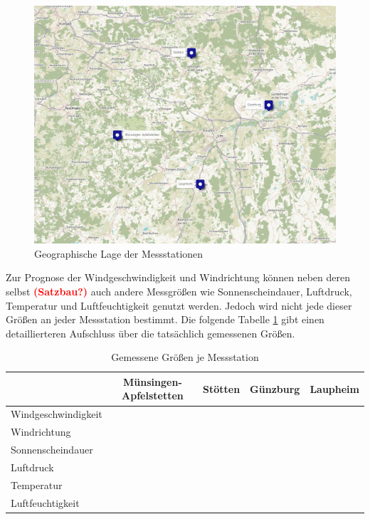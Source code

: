 \documentclass[
12pt, %
toc=listofnumbered, %
toc=chapterentrydotfill, %
numbers=noenddot, %
captions=tableheading, %
bibliography=numbered
]{scrreprt}
\newcommand{\cmark}{\ding{51}}%
\newcommand{\xmark}{\ding{55}}%
\newcommand{\highlight}[1]{\textbf{\textcolor{red}{#1}}}
\begin{document}
\begin{figure}[tph]
	\begin{center}
		\includegraphics[width=\textwidth]{./images/map.png}
		\caption{Geographische Lage der Messstationen \cite{2021_OpenStreetMap-Contributors_UMap}}
		\label{fig:map}
	\end{center}
\end{figure}

Zur Prognose der Windgeschwindigkeit und Windrichtung können neben deren selbst \highlight{(Satzbau?)} auch andere Messgrößen wie Sonnenscheindauer, Luftdruck, Temperatur und Luftfeuchtigkeit genutzt werden. Jedoch wird nicht jede dieser Größen an jeder Messstation bestimmt. Die folgende Tabelle \ref{tab:messgrößen} gibt einen detaillierteren Aufschluss über die tatsächlich gemessenen Größen.

\begin{table}[ht]
	\centering
	\caption{Gemessene Größen je Messstation}
	\begin{tabular}{|l|c|c|c|c|}
		\hline
        \rowcolor{color80}
		& \textbf{Münsingen-Apfelstetten} & \textbf{Stötten} & \textbf{Günzburg} & \textbf{Laupheim} \\\hline
		Windgeschwindigkeit & \cmark & \cmark & \cmark & \cmark \\\hline
		Windrichtung & \cmark & \cmark & \cmark & \cmark \\\hline
		Sonnenscheindauer & \cmark & \cmark & \xmark & \xmark \\\hline
		Luftdruck & \xmark & \cmark & \xmark & \cmark \\\hline
		Temperatur & \cmark & \cmark & \cmark & \cmark \\\hline
		Luftfeuchtigkeit & \cmark & \cmark & \cmark & \cmark \\\hline
	\end{tabular}
\label{tab:messgrößen}
\end{table}
\end{document}
